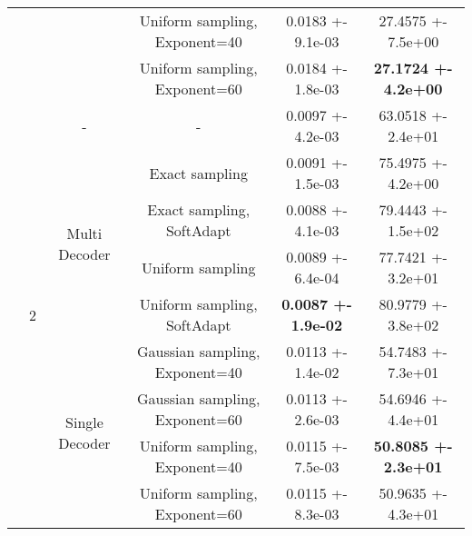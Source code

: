 \begin{tabular}{||c|c|c|c|c|c||}
\cline{4-6}
 &  &  & Uniform sampling, Exponent=40 & 0.0183 +- 9.1e-03 & 27.4575 +- 7.5e+00 \\
\cline{4-6}
 &  &  & Uniform sampling, Exponent=60 & 0.0184 +- 1.8e-03 & \textbf{27.1724 +- 4.2e+00} \\
\cline{4-6}
\cline{3-6}
\cline{2-6}
 & \multirow{9}{*}{2} & \multirow{1}{*}{-} & - & 0.0097 +- 4.2e-03 & 63.0518 +- 2.4e+01 \\
\cline{4-6}
\cline{3-6}
 &  & \multirow{4}{*}{Multi Decoder} & Exact sampling & 0.0091 +- 1.5e-03 & 75.4975 +- 4.2e+00 \\
\cline{4-6}
 &  &  & Exact sampling, SoftAdapt & 0.0088 +- 4.1e-03 & 79.4443 +- 1.5e+02 \\
\cline{4-6}
 &  &  & Uniform sampling & 0.0089 +- 6.4e-04 & 77.7421 +- 3.2e+01 \\
\cline{4-6}
 &  &  & Uniform sampling, SoftAdapt & \textbf{0.0087 +- 1.9e-02} & 80.9779 +- 3.8e+02 \\
\cline{4-6}
\cline{3-6}
 &  & \multirow{4}{*}{Single Decoder} & Gaussian sampling, Exponent=40 & 0.0113 +- 1.4e-02 & 54.7483 +- 7.3e+01 \\
\cline{4-6}
 &  &  & Gaussian sampling, Exponent=60 & 0.0113 +- 2.6e-03 & 54.6946 +- 4.4e+01 \\
\cline{4-6}
 &  &  & Uniform sampling, Exponent=40 & 0.0115 +- 7.5e-03 & \textbf{50.8085 +- 2.3e+01} \\
\cline{4-6}
 &  &  & Uniform sampling, Exponent=60 & 0.0115 +- 8.3e-03 & 50.9635 +- 4.3e+01 \\
\cline{4-6}
\cline{3-6}
\cline{2-6}
\hline
\hline
\end{tabular}
